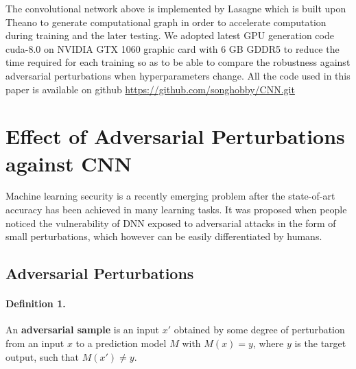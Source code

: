\documentclass{article}
\begin{document}
The convolutional network above is implemented by Lasagne\cite{Lasagne} which is built upon Theano\cite{Theano} to generate computational graph in order to accelerate computation during training and the later testing.
We adopted latest GPU generation code cuda-8.0 on NVIDIA GTX 1060 graphic card with 6 GB GDDR5 to reduce the time required for each training so as to be able to compare the robustness against adversarial perturbations when hyperparameters change.
All the code used in this paper is available on github \url{https://github.com/songhobby/CNN.git}

\section{Effect of Adversarial Perturbations against CNN}
Machine learning security is a recently emerging problem after the state-of-art accuracy has been achieved in many learning tasks. It was proposed when people noticed the vulnerability of DNN exposed to adversarial attacks in the form of small perturbations, which however can be easily differentiated by humans.
\subsection{Adversarial Perturbations}
\paragraph{Definition 1.}
An \textbf{adversarial sample} is an input $x\prime$ obtained by some degree of perturbation from an input $x$ to a prediction model $M$ with $M(x)=y$, where $y$ is the target output, such that $M(x\prime) \ne y$.
\end{document}

